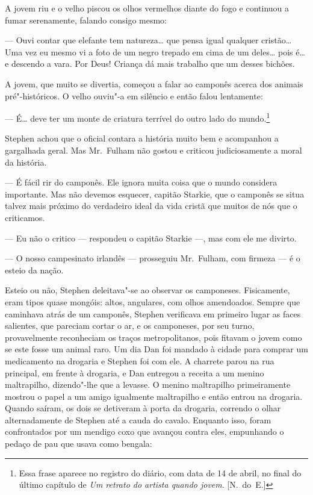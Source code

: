 A jovem riu e o velho piscou os olhos vermelhos diante do fogo e
continuou a fumar serenamente, falando consigo mesmo:

--- Ouvi contar que elefante tem natureza\ldots{} que pensa igual
qualquer cristão\ldots{}  Uma vez eu mesmo vi a foto de um negro trepado em
cima de um deles\ldots{} pois é\ldots{} e descendo a vara.  Por Deus!  Criança dá
mais trabalho que um desses bichões.

A jovem, que muito se divertia, começou a falar ao camponês acerca
dos animais pré"-históricos.  O velho ouviu"-a em silêncio e então falou
lentamente:

--- É\ldots{} deve ter um monte de criatura terrível do outro lado do
mundo.\footnote{ Essa frase aparece no registro do diário, com data de
14 de abril, no final do último capítulo de \textit{Um retrato do
artista quando jovem}. [N.~do~E.]}

Stephen achou que o oficial contara a história muito bem e
acompanhou a gargalhada geral.  Mas Mr.~Fulham não gostou e criticou
judiciosamente a moral da história.

--- É fácil rir do camponês.  Ele ignora muita coisa que o mundo
considera importante.  Mas não devemos esquecer, capitão Starkie, que o
camponês se situa talvez mais próximo do verdadeiro ideal da
vida cristã que muitos de nós que o criticamos.

--- Eu não o critico --- respondeu o capitão Starkie ---, mas com
ele me divirto.

--- O nosso campesinato irlandês --- prosseguiu Mr.~Fulham, com
firmeza --- é o esteio da nação.

Esteio ou não, Stephen deleitava"-se ao observar os camponeses. 
Fisicamente, eram tipos quase mongóis: altos, angulares, com olhos
amendoados.  Sempre que caminhava atrás de um camponês, Stephen
verificava em primeiro lugar as faces salientes, que pareciam cortar o
ar, e os camponeses, por seu turno, provavelmente reconheciam os traços
metropolitanos, pois fitavam o jovem como se este fosse um animal raro.
 Um dia Dan foi mandado à cidade para comprar um medicamento na
drogaria e Stephen foi com ele.  A charrete parou na rua principal, em
frente à drogaria, e Dan entregou a receita a um menino maltrapilho,
dizendo"-lhe que a levasse.  O menino maltrapilho primeiramente mostrou
o papel a um amigo igualmente maltrapilho e então entrou na drogaria. 
Quando saíram, os dois se detiveram à porta da drogaria, correndo o
olhar alternadamente de Stephen até a cauda do cavalo.  Enquanto isso,
foram confrontados por um mendigo coxo que avançou contra eles,
empunhando o pedaço de pau que usava como bengala:

